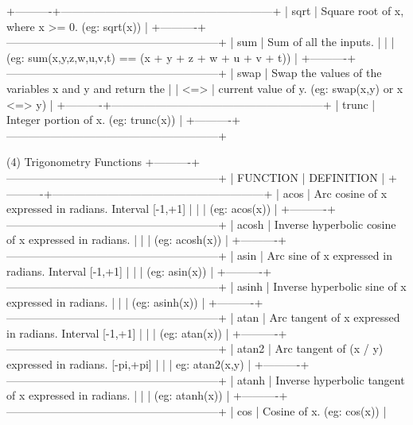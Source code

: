 +----------+---------------------------------------------------------+
| sqrt     | Square root of x, where x >= 0.  (eg: sqrt(x))          |
+----------+---------------------------------------------------------+
| sum      | Sum of all the inputs.                                  |
|          | (eg: sum(x,y,z,w,u,v,t) == (x + y + z + w + u + v + t)) |
+----------+---------------------------------------------------------+
| swap     | Swap the values of the variables x and y and return the |
| <=>      | current value of y.  (eg: swap(x,y) or x <=> y)         |
+----------+---------------------------------------------------------+
| trunc    | Integer portion of x.  (eg: trunc(x))                   |
+----------+---------------------------------------------------------+

(4) Trigonometry Functions
+----------+---------------------------------------------------------+
| FUNCTION | DEFINITION                                              |
+----------+---------------------------------------------------------+
| acos     | Arc cosine of x expressed in radians. Interval [-1,+1]  |
|          | (eg: acos(x))                                           |
+----------+---------------------------------------------------------+
| acosh    | Inverse hyperbolic cosine of x expressed in radians.    |
|          | (eg: acosh(x))                                          |
+----------+---------------------------------------------------------+
| asin     | Arc sine of x expressed in radians. Interval [-1,+1]    |
|          | (eg: asin(x))                                           |
+----------+---------------------------------------------------------+
| asinh    | Inverse hyperbolic sine of x expressed in radians.      |
|          | (eg: asinh(x))                                          |
+----------+---------------------------------------------------------+
| atan     | Arc tangent of x expressed in radians. Interval [-1,+1] |
|          | (eg: atan(x))                                           |
+----------+---------------------------------------------------------+
| atan2    | Arc tangent of (x / y) expressed in radians. [-pi,+pi]  |
|          | eg: atan2(x,y)                                          |
+----------+---------------------------------------------------------+
| atanh    | Inverse hyperbolic tangent of x expressed in radians.   |
|          | (eg: atanh(x))                                          |
+----------+---------------------------------------------------------+
| cos      | Cosine of x.  (eg: cos(x))                              |
